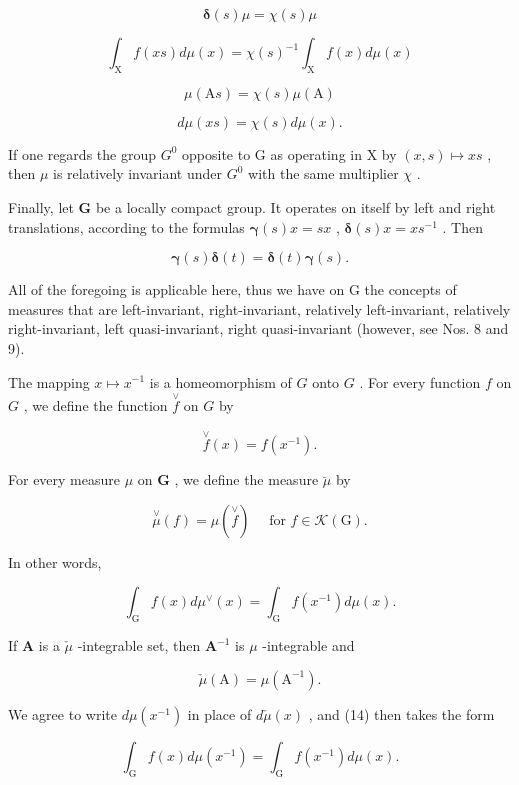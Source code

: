 \[
\boldsymbol {\delta} (s) \mu = \chi (s) \mu\tag{7'}
\]

\[
\int_ {\mathrm{X}} f (x s) d \mu (x) = \chi (s) ^ {- 1} \int_ {\mathrm{X}} f (x) d \mu (x)\tag{8'}
\]

\[
\mu (\mathrm{A} s) = \chi (s) \mu (\mathrm{A})\tag{9'}
\]

\[
d \mu (x s) = \chi (s) d \mu (x).\tag{10'}
\]

If one regards the group \(G^{0}\) opposite to G as operating in X by \((x, s) \mapsto xs\) , then \(\mu\) is relatively invariant under \(G^{0}\) with the same multiplier \(\chi\) .

Finally, let \(\mathbf{G}\) be a locally compact group. It operates on itself by left and right translations, according to the formulas \(\pmb{\gamma}(s)x = sx\) , \(\pmb{\delta}(s)x = xs^{-1}\) . Then

\[
\boldsymbol {\gamma} (s) \boldsymbol {\delta} (t) = \boldsymbol {\delta} (t) \boldsymbol {\gamma} (s).\tag{11}
\]

All of the foregoing is applicable here, thus we have on G the concepts of measures that are left-invariant, right-invariant, relatively left-invariant, relatively right-invariant, left quasi-invariant, right quasi-invariant (however, see Nos. 8 and 9).

The mapping \(x \mapsto x^{-1}\) is a homeomorphism of \(G\) onto \(G\) . For every function \(f\) on \(G\) , we define the function \(\overset{\vee}{f}\) on \(G\) by

\[
\stackrel {\vee} {f} (x) = f (x ^ {- 1}).\tag{12}
\]

For every measure \(\mu\) on \(\mathbf{G}\) , we define the measure \(\breve{\mu}\) by

\[
\stackrel {\vee} {\mu} (f) = \mu (\stackrel {\vee} {f}) \quad \text { for } f \in \mathcal {K} (\mathrm{G}).\tag{13}
\]

In other words,

\[
\int_ {\mathrm{G}} f (x) d \mu^ {\vee} (x) = \int_ {\mathrm{G}} f (x ^ {- 1}) d \mu (x).\tag{14}
\]

If \(\mathbf{A}\) is a \(\check{\mu}\) -integrable set, then \(\mathbf{A}^{-1}\) is \(\mu\) -integrable and

\[
\check {\mu} (\mathrm{A}) = \mu (\mathrm{A} ^ {- 1}).\tag{15}
\]

We agree to write \(d\mu(x^{-1})\) in place of \(d\check{\mu}(x)\) , and (14) then takes the form

\[
\int_ {\mathrm{G}} f (x) d \mu (x ^ {- 1}) = \int_ {\mathrm{G}} f (x ^ {- 1}) d \mu (x).
\]

